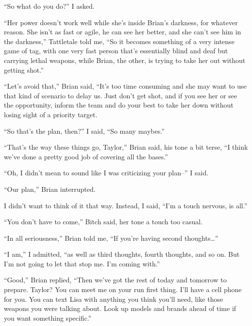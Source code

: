 ``So what do you do?'' I asked.



``Her power doesn't work well while she's inside Brian's darkness, for whatever reason.  She isn't as fast or agile, he can see her better, and she can't see him in the darkness,'' Tattletale told me, ``So it becomes something of a very intense game of tag, with one very fast person that's essentially blind and deaf but carrying lethal weapons, while Brian, the other, is trying to take her out without getting shot.''



``Let's avoid that,'' Brian said, ``It's too time consuming and she may want to use that kind of scenario to delay us.  Just don't get shot, and if you see her or see the opportunity, inform the team and do your best to take her down without losing sight of a priority target.



``So that's the plan, then?'' I said, ``So many maybes.''



``That's the way these things go, Taylor,'' Brian said, his tone a bit terse, ``I think we've done a pretty good job of covering all the bases.''



``Oh, I didn't mean to sound like I was criticizing your plan--'' I said.



``Our plan,'' Brian interrupted.



I didn't want to think of it that way.  Instead, I said, ``I'm a touch nervous, is all.''



``You don't have to come,'' Bitch said, her tone a touch too casual.



``In all seriousness,'' Brian told me, ``If you're having second thoughts\ldots''



``I am,'' I admitted, ``as well as third thoughts, fourth thoughts, and so on.  But I'm not going to let that stop me.  I'm coming with.''



``Good,'' Brian replied, ``Then we've got the rest of today and tomorrow to prepare.  Taylor?  You can meet me on your run first thing.  I'll have a cell phone for you.  You can text Lisa with anything you think you'll need, like those weapons you were talking about.  Look up models and brands ahead of time if you want something specific.''



